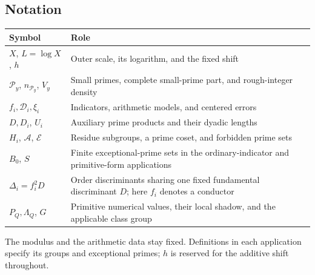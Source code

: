 \subsection{Notation}

\begin{center}\small
\begin{tabular}{@{}>{\raggedright\arraybackslash}p{.28\linewidth}>{\raggedright\arraybackslash}p{.66\linewidth}@{}}
\hline
Symbol&Role\\\hline
\(X\), \(L=\log X\), \(h\)&Outer scale, its logarithm, and the fixed shift\\
\(\mathcal P_y\), \(n_{\mathcal P_y}\), \(V_y\)&Small primes, complete small-prime part, and rough-integer density\\
\(f_i,\mathcal D_i,\xi_i\)&Indicators, arithmetic models, and centered errors\\
\(D,D_i\), \(U_i\)&Auxiliary prime products and their dyadic lengths\\
\(H_i\), \(\mathscr A\), \(\mathcal E\)&Residue subgroups, a prime coset, and forbidden prime sets\\
\(B_0\), \(S\)&Finite exceptional-prime sets in the ordinary-indicator and primitive-form applications\\
\(\Delta_i=f_i^2D\)&Order discriminants sharing one fixed fundamental discriminant \(D\); here \(f_i\) denotes a conductor\\
\(P_Q,\Lambda_Q\), \(G\)&Primitive numerical values, their local shadow, and the applicable class group\\\hline
\end{tabular}
\end{center}
The modulus and the arithmetic data stay fixed. Definitions in each
application specify its groups and exceptional primes; \(h\) is
reserved for the additive shift throughout.
